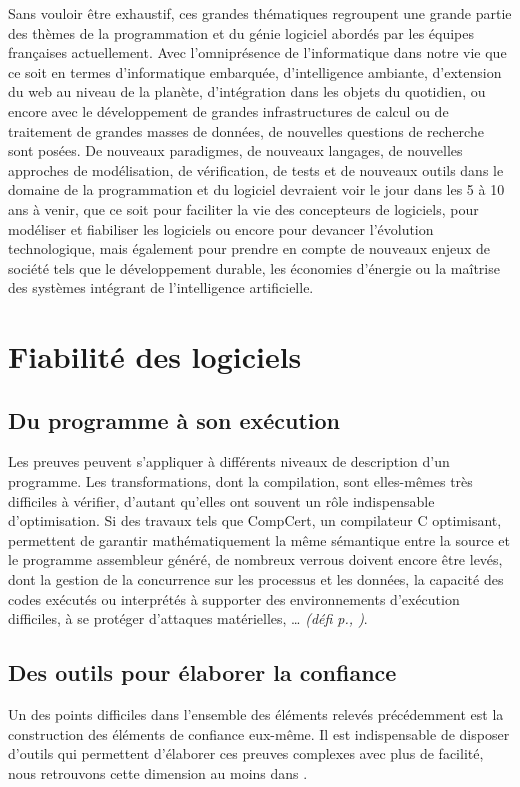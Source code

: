 \documentclass[11pt]{article}
\newcommand{\defi}[1]{\emph{(défi p.\pageref{#1}, \cite{#1})}}
\begin{document}
Sans vouloir être exhaustif, ces grandes thématiques regroupent une grande partie des
thèmes de la programmation et du génie logiciel abordés par les équipes
françaises actuellement. 
\noindent
Avec l'omniprésence de l'informatique dans notre vie que ce soit en termes
d'informatique embarquée, d'intelligence ambiante, d'extension du web au niveau
de la planète, d'intégration dans les objets du quotidien, ou encore avec le
développement de grandes infrastructures de calcul ou de traitement de grandes
masses de données, de nouvelles questions de recherche sont posées.
De nouveaux paradigmes, de nouveaux langages, de nouvelles approches de
modélisation, de vérification, de tests et de nouveaux outils dans le domaine
de la programmation et du logiciel devraient voir le jour dans les 5 à 10 ans à
venir, que ce soit pour faciliter la vie des concepteurs de logiciels, pour
modéliser et fiabiliser les logiciels ou encore pour devancer l'évolution
technologique, mais également pour prendre en compte de nouveaux enjeux de
société tels que le développement durable, les économies d'énergie ou la maîtrise des systèmes intégrant de l'intelligence artificielle.



\section{Fiabilité des logiciels}

\subsection{Du programme à son exécution}
Les preuves peuvent s'appliquer à différents niveaux de description d'un programme. Les transformations, dont la compilation, sont elles-mêmes très difficiles à vérifier, d'autant qu'elles ont souvent un rôle indispensable d'optimisation. Si des travaux tels que CompCert, un compilateur C optimisant, permettent de garantir mathématiquement la même sémantique entre la source et le programme assembleur généré, de nombreux verrous doivent encore être levés, dont la gestion de la concurrence sur les processus et les données, la capacité des codes exécutés ou interprétés à supporter des environnements d'exécution difficiles, à se protéger d'attaques matérielles, … \defi{Monniaux}.

\subsection{Des outils pour élaborer la confiance}
Un des points difficiles dans l'ensemble des éléments relevés précédemment est la construction des éléments de confiance eux-même. Il est indispensable de disposer d'outils qui permettent d'élaborer ces preuves complexes avec plus de facilité, nous retrouvons cette dimension au moins dans \cite{Monniaux}.  
\end{document}
